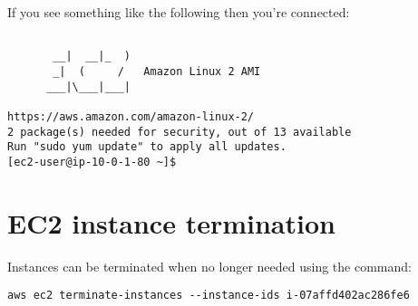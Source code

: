 \documentclass{pgnotes}
\begin{document}
If you see something like the following then you're connected:

\begin{verbatim}

       __|  __|_  )
       _|  (     /   Amazon Linux 2 AMI
      ___|\___|___|

https://aws.amazon.com/amazon-linux-2/
2 package(s) needed for security, out of 13 available
Run "sudo yum update" to apply all updates.
[ec2-user@ip-10-0-1-80 ~]$ 
\end{verbatim}

\section{EC2 instance termination}

Instances can be terminated when no longer needed using the command: 

\begin{verbatim}
aws ec2 terminate-instances --instance-ids i-07affd402ac286fe6
\end{verbatim}
\end{document}
